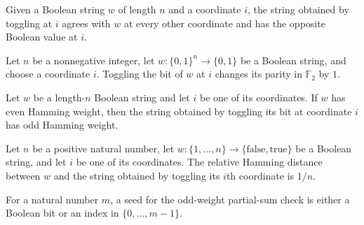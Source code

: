 \begin{definition}
\label{FABL.toggleStringAt}
\leanok
Given a Boolean string $w$ of length $n$ and a coordinate $i$, the string obtained by
toggling at $i$ agrees with $w$ at every other coordinate and has the opposite Boolean
value at $i$.
\end{definition}

\begin{theorem}
\label{FABL.boolStringParity_toggleStringAt}
\leanok
{}
Let $n$ be a nonnegative integer, let $w\colon\{0,1\}^n\to\{0,1\}$ be a Boolean string,
and choose a coordinate $i$. Toggling the bit of $w$ at $i$ changes its parity in
$\mathbb{F}_2$ by $1$.
\end{theorem}

\begin{theorem}
\label{FABL.toggleStringAt_isOddWeight_of_not}
\leanok
{}
Let $w$ be a length-$n$ Boolean string and let $i$ be one of its coordinates. If $w$ has
even Hamming weight, then the string obtained by toggling its bit at coordinate $i$ has
odd Hamming weight.
\end{theorem}

\begin{theorem}
\label{FABL.relativeHammingDist_toggleStringAt}
\leanok
{}
Let $n$ be a positive natural number, let
$w:\{1,\ldots,n\}\to\{\mathrm{false},\mathrm{true}\}$ be a Boolean string, and let $i$
be one of its coordinates. The relative Hamming distance between $w$ and the string
obtained by toggling its $i$th coordinate is $1/n$.
\end{theorem}

\begin{definition}
\label{FABL.OddWeightPartialSumCheckSeed}
\leanok
For a natural number $m$, a seed for the odd-weight partial-sum check is either a
Boolean bit or an index in $\{0,\ldots,m-1\}$.
\end{definition}

